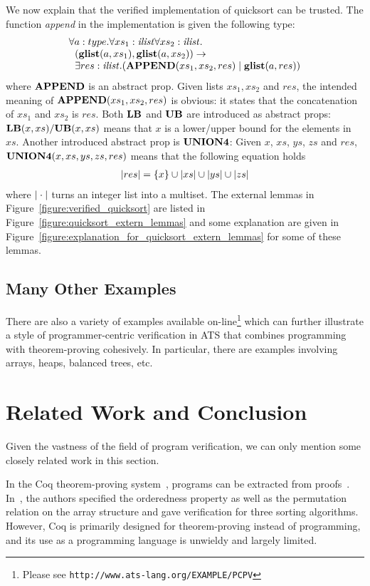 \documentclass{llncs}
\begin{document}
We now explain that the verified implementation of quicksort can be
trusted. The function {\it append} in the implementation is given the
following type:
\[\begin{array}{l}
\forall a:type.\forall xs_1:{\it ilist}\forall xs_2:{\it ilist}.~ \\
\kern6pt({\bf glist}(a, xs_1), {\bf glist}(a, xs_2))\rightarrow \\
\kern6pt\exists res:{\it ilist}.({\bf APPEND}(xs_1, xs_2, res) \mid {\bf glist} (a, res)) \\
\end{array}\]
where ${\bf APPEND}$ is an abstract prop. Given lists $xs_1,xs_2$ and $res$,
the intended meaning of ${\bf APPEND}(xs_1,xs_2,res)$ is obvious: it states
that the concatenation of $xs_1$ and $xs_2$ is $res$. Both ${\bf LB}$ and
${\bf UB}$ are introduced as abstract props: ${\bf LB}(x, xs)/{\bf UB}(x,xs)$ means
that $x$ is a lower/upper bound for the elements in $xs$. Another
introduced abstract prop is ${\bf UNION4}$: Given $x$, $xs$, $ys$, $zs$ and
$res$, ${\bf UNION4}(x, xs, ys, zs, res)$ means that the following equation
holds
\[\begin{array}{rcl}
|res|=\{x\}\cup|xs|\cup|ys|\cup|zs| \\
\end{array}\]
where $|\cdot|$ turns an integer list into a multiset.  The external
lemmas in Figure~\ref{figure:verified_quicksort} are listed in
Figure~\ref{figure:quicksort_extern_lemmas} and some explanation are given
in Figure~\ref{figure:explanation_for_quicksort_extern_lemmas} for some of
these lemmas. 

\subsection{Many Other Examples}
There are also a variety of examples available on-line\footnote{ Please see
  \texttt{http://www.ats-lang.org/EXAMPLE/PCPV} } which can further
illustrate a style of programmer-centric verification in ATS that combines
programming with theorem-proving cohesively. In particular, there are
examples involving arrays, heaps, balanced trees, etc.

\section{Related Work and Conclusion}\label{section:rwconc}
Given the vastness of the field of program verification, we can only
mention some closely related work in this section.

In the Coq theorem-proving system~\cite{Dowek93tr}, programs can be
extracted from proofs~\cite{CoqExtraction}.
In~\cite{FilliatreCertification}, the authors specified the orderedness
property as well as the permutation relation on the array structure and
gave verification for three sorting algorithms. However, Coq is primarily
designed for theorem-proving instead of programming, and its use as a
programming language is unwieldy and largely limited.
\end{document}
